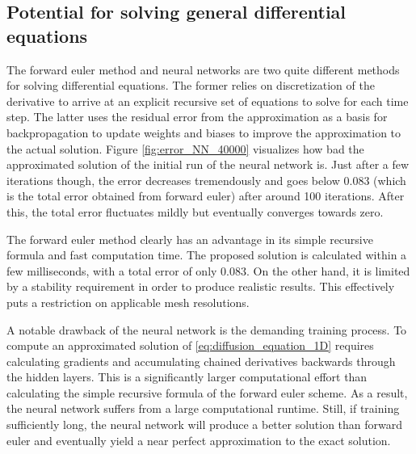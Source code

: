 \documentclass[12pt]{extarticle}
\begin{document}
\subsection{Potential for solving general differential equations}
The forward euler method and neural networks are two quite different methods for solving differential equations. The former relies on discretization of the derivative to arrive at an explicit recursive set of equations to solve for each time step. The latter uses the residual error from the approximation as a basis for backpropagation to update weights and biases to improve the approximation to the actual solution. Figure \ref{fig:error_NN_40000} visualizes how bad the approximated solution of the initial run of the neural network is. Just after a few iterations though, the error decreases tremendously and goes below 0.083 (which is the total error obtained from forward euler) after around 100 iterations. After this, the total error fluctuates mildly but eventually converges towards zero.
 
\par The forward euler method clearly has an advantage in its simple recursive formula and fast computation time. The proposed solution is calculated within a few milliseconds, with a total error of only 0.083. On the other hand, it is limited by a stability requirement in order to produce realistic results. This effectively puts a restriction on applicable mesh resolutions.

\par A notable drawback of the neural network is the demanding training process. To compute an approximated solution of \eqref{eq:diffusion_equation_1D} requires calculating gradients and accumulating chained derivatives backwards through the hidden layers. This is a significantly larger computational effort than calculating the simple recursive formula of the forward euler scheme. As a result, the neural network suffers from a large computational runtime. Still, if training sufficiently long, the neural network will produce a better solution than forward euler and eventually yield a near perfect approximation to the exact solution. 
\end{document}
